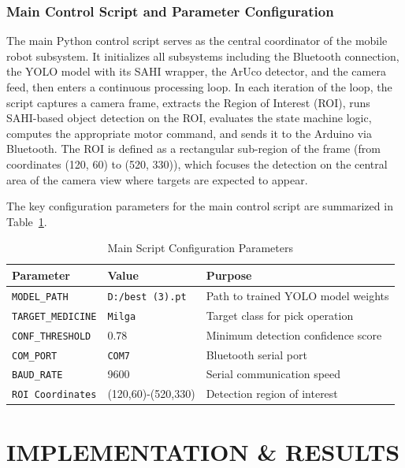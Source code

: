 \documentclass[12pt,a4paper,oneside]{report}
\begin{document}
\subsection{Main Control Script and Parameter Configuration}\label{main-control-script-and-parameter-configuration}

The main Python control script serves as the central coordinator of the mobile robot subsystem. It initializes all subsystems including the Bluetooth connection, the YOLO model with its SAHI wrapper, the ArUco detector, and the camera feed, then enters a continuous processing loop. In each iteration of the loop, the script captures a camera frame, extracts the Region of Interest (ROI), runs SAHI-based object detection on the ROI, evaluates the state machine logic, computes the appropriate motor command, and sends it to the Arduino via Bluetooth. The ROI is defined as a rectangular sub-region of the frame (from coordinates (120, 60) to (520, 330)), which focuses the detection on the central area of the camera view where targets are expected to appear.

The key configuration parameters for the main control script are summarized in Table~\ref{tab:table_main_script_params}.

\begin{table}[htbp]
\centering
\caption{Main Script Configuration Parameters\label{tab:table_main_script_params}}
\begin{tabular}{lll}
\toprule
\textbf{Parameter} & \textbf{Value} & \textbf{Purpose} \\
\midrule
\texttt{MODEL\_PATH} & \texttt{D:/best (3).pt} & Path to trained YOLO model weights \\
\texttt{TARGET\_MEDICINE} & \texttt{Milga} & Target class for pick operation \\
\texttt{CONF\_THRESHOLD} & 0.78 & Minimum detection confidence score \\
\texttt{COM\_PORT} & \texttt{COM7} & Bluetooth serial port \\
\texttt{BAUD\_RATE} & 9600 & Serial communication speed \\
\texttt{ROI Coordinates} & (120,60)-(520,330) & Detection region of interest \\
\bottomrule
\end{tabular}
\end{table}

\chapter{IMPLEMENTATION \& RESULTS}
\label{implementation-results}
\end{document}
